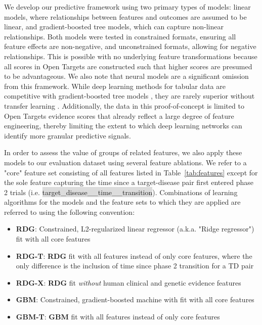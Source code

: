 \documentclass{article}
\begin{document}
We develop our predictive framework using two primary types of models: linear models, where relationships between features and outcomes are assumed to be linear, and gradient-boosted tree models, which can capture non-linear relationships. Both models were tested in constrained formats, ensuring all feature effects are non-negative, and unconstrained formats, allowing for negative relationships. This is possible with no underlying feature transformations because all scores in Open Targets are constructed such that higher scores are presumed to be advantageous. We also note that neural models are a significant omission from this framework. While deep learning methods for tabular data are competitive with gradient-boosted tree models \cite{mcelfresh2023neural, gorishniy2023revisiting, somepalli2021saint}, they are rarely superior without transfer learning \cite{mcelfresh2023neural, levin2023transfer, hollmann2023tabpfn}. Additionally, the data in this proof-of-concept is limited to Open Targets evidence scores that already reflect a large degree of feature engineering, thereby limiting the extent to which deep learning networks can identify more granular predictive signals.

In order to assess the value of groups of related features, we also apply these models to our evaluation dataset using several feature ablations. We refer to a "core" feature set consisting of all features listed in Table~\ref{tab:features} except for the sole feature capturing the time since a target-disease pair first entered phase 2 trials (i.e. \colorbox{Gainsboro}{target\_disease\_\_time\_\_transition}). Combinations of learning algorithms for the models and the feature sets to which they are applied are referred to using the following convention:

\begin{itemize}
  \item \textbf{RDG}: Constrained, L2-regularized linear regressor (a.k.a. "Ridge regressor") fit with all core features
  \item \textbf{RDG-T}: \textbf{RDG} fit with all features instead of only core features, where the only difference is the inclusion of time since phase 2 transition for a TD pair
  \item \textbf{RDG-X}: \textbf{RDG} fit \textit{without} human clinical and genetic evidence features
  \item \textbf{GBM}: Constrained, gradient-boosted machine with fit with all core features
  \item \textbf{GBM-T}: \textbf{GBM} fit with all features instead of only core features
\end{itemize}
\end{document}
